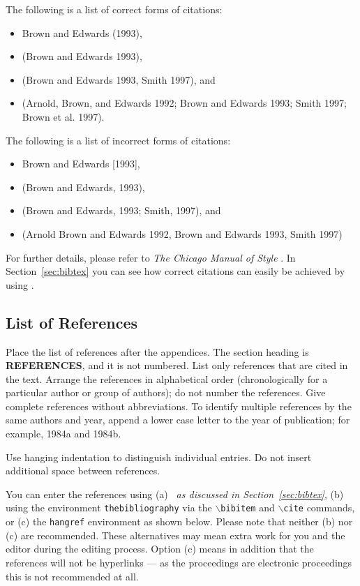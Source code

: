 \documentclass{wscpaperproc}
\theoremstyle{wsc}
\begin{document}
The following is a list of correct forms of citations:
\begin{itemize}
\item Brown and Edwards (1993),
\item (Brown and Edwards 1993),
\item (Brown and Edwards 1993, Smith 1997), and
\item (Arnold, Brown, and Edwards 1992; Brown and Edwards 1993; Smith 1997; Brown et al. 1997).
\end{itemize}

The following is a list of incorrect forms of citations:
\begin{itemize}
\item Brown and Edwards [1993],
\item (Brown and Edwards, 1993),
\item (Brown and Edwards, 1993; Smith, 1997), and
\item (Arnold Brown and Edwards 1992, Brown and Edwards 1993, Smith 1997)
\end{itemize}

For further details, please refer to {\it The Chicago Manual of Style} \cite{chicago03}. In Section~\ref{sec:bibtex} you can see how correct citations can easily be achieved by using \BibTeX .

\subsection{List of References}
Place the list of references after the appendices. The section heading is {\bf REFERENCES}, and it is not numbered. List only references that are cited in the text.
Arrange the references in alphabetical order (chronologically for a particular author or group of authors); do not number the references.
Give complete references without abbreviations.
To identify multiple references by the same authors and year, append a lower case letter to the year of publication; for example, 1984a and 1984b.

Use hanging indentation to distinguish individual entries. Do not insert additional space between references.

You can enter the references using (a) {\em \BibTeX\ as discussed in Section~\ref{sec:bibtex}}, (b) using the environment {\tt thebibliography} via the {\tt $\backslash$bibitem} and {\tt $\backslash$cite} commands, or (c) the {\tt hangref} environment as shown below.
Please note that neither (b) nor (c) are recommended. These alternatives may mean extra work for you and the editor during the editing process. Option (c) means in addition that the references will not be hyperlinks --- as the proceedings are electronic proceedings this is not recommended at all.
\end{document}
